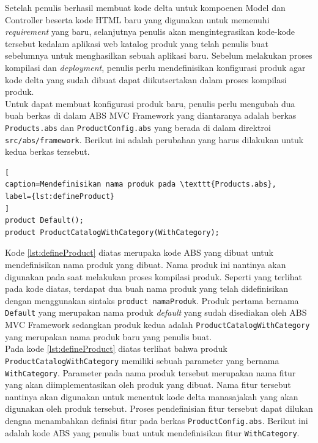 Setelah penulis berhasil membuat kode delta untuk kompoenen Model dan Controller beserta kode HTML baru yang digunakan untuk memenuhi \textit{requirement} yang baru, selanjutnya penulis akan mengintegrasikan kode-kode tersebut kedalam aplikasi web katalog produk yang telah penulis buat sebelumnya untuk menghasilkan sebuah aplikasi baru. Sebelum melakukan proses kompilasi dan \textit{deployment}, penulis perlu mendefinisikan konfigurasi produk agar kode delta yang sudah dibuat dapat diikutsertakan dalam proses kompilasi produk.\\

Untuk dapat membuat konfigurasi produk baru, penulis perlu mengubah dua buah berkas di dalam ABS MVC Framework yang diantaranya adalah berkas \texttt{Products.abs} dan \texttt{ProductConfig.abs} yang berada di dalam direktroi \texttt{src/abs/framework}. Berikut ini adalah perubahan yang harus dilakukan untuk kedua berkas tersebut.

\begin{lstlisting}[
caption=Mendefinisikan nama produk pada \texttt{Products.abs},
label={lst:defineProduct}
]
product Default();
product ProductCatalogWithCategory(WithCategory);
\end{lstlisting}

Kode \ref{lst:defineProduct} diatas merupaka kode ABS yang dibuat untuk mendefinisikan nama produk yang dibuat. Nama produk ini nantinya akan digunakan pada saat melakukan proses kompilasi produk. Seperti yang terlihat pada kode diatas, terdapat dua buah nama produk yang telah didefinisikan dengan menggunakan sintaks \texttt{product namaProduk}. Produk pertama bernama \texttt{Default} yang merupakan nama produk \textit{default} yang sudah disediakan oleh ABS MVC Framework sedangkan produk kedua adalah \texttt{ProductCatalogWithCategory} yang merupakan nama produk baru yang penulis buat.\\

Pada kode \ref{lst:defineProduct} diatas terlihat bahwa produk \texttt{ProductCatalogWithCategory} memiliki sebuah parameter yang bernama \texttt{WithCategory}. Parameter pada nama produk tersebut merupakan nama fitur yang akan diimplementasikan oleh produk yang dibuat. Nama fitur tersebut nantinya akan digunakan untuk menentuk kode delta manasajakah yang akan digunakan oleh produk tersebut. Proses pendefinisian fitur tersebut dapat dilukan dengna menambahkan definisi fitur pada berkas \texttt{ProductConfig.abs}. Berikut ini adalah kode ABS yang penulis buat untuk mendefinisikan fitur \texttt{WithCategory}.

